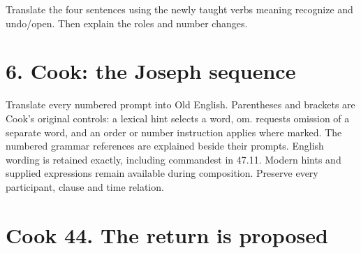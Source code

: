 Translate the four sentences using the newly taught verbs meaning recognize and undo/\allowbreak{}open. Then explain the roles and number changes.






\section*{6. Cook: the Joseph sequence}

Translate every numbered prompt into Old English. Parentheses and brackets are Cook’s original controls: a lexical hint selects a word, om. requests omission of a separate word, and an order or number instruction applies where marked. The numbered grammar references are explained beside their prompts. English wording is retained exactly, including commandest in 47.11. Modern hints and supplied expressions remain available during composition. Preserve every participant, clause and time relation.

\section*{Cook 44. The return is proposed}

